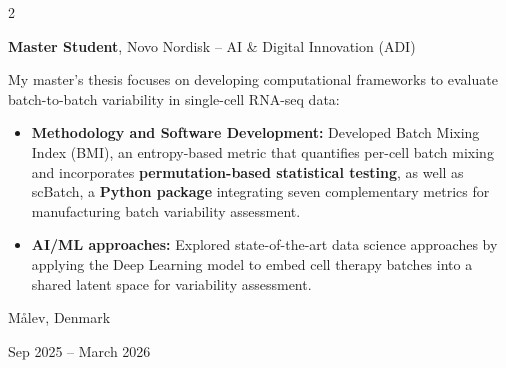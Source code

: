 \documentclass[10pt, letterpaper]{article}
\newenvironment{highlights}{
    \begin{itemize}[
        topsep=0.10 cm,
        parsep=0.10 cm,
        partopsep=0pt,
        itemsep=0pt,
        leftmargin=0.4 cm + 10pt
    ]
}{
    \end{itemize}
}
\newenvironment{twocolentry}[2][]{
    \onecolentry
    \def\secondColumn{#2}
    \setcolumnwidth{\fill, 4.5 cm}
    \begin{paracol}{2}
}{
    \switchcolumn \raggedleft \secondColumn
    \end{paracol}
    \endonecolentry
}
\begin{document}
        \begin{twocolentry}{
    Målev, Denmark

    Sep 2025 -- March 2026
}
    \textbf{Master Student}, Novo Nordisk -- AI \& Digital Innovation (ADI)

    \vspace{0.1cm}

    My master's thesis focuses on developing computational frameworks to evaluate batch-to-batch variability in single-cell RNA-seq data:

    \begin{highlights}

        \item \textbf{Methodology and Software Development:} Developed Batch Mixing Index (BMI), an entropy-based metric that quantifies per-cell batch mixing and incorporates \textbf{permutation-based statistical testing}, as well as scBatch, a \textbf{Python package} integrating seven complementary metrics for manufacturing batch variability assessment.

        \vspace{0.1cm}

        \item \textbf{AI/ML approaches:} Explored state-of-the-art data science approaches by applying the Deep Learning model to embed cell therapy batches into a shared latent space for variability assessment.

    \end{highlights}
\end{twocolentry}

        \vspace{0.3 cm}
\end{document}
